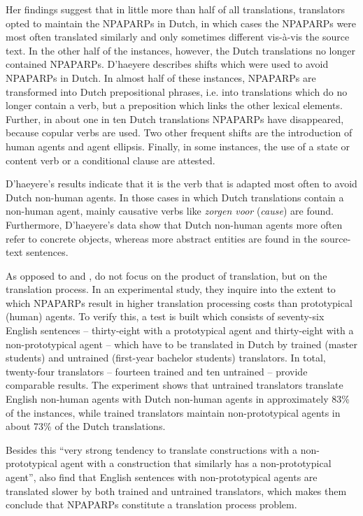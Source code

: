 \documentclass[output=paper]{LSP/langsci}
\begin{document}
Her findings suggest that in little more than half of all translations, translators opted to maintain the NPAPARPs in Dutch, in which cases the NPAPARPs were most often translated similarly and only sometimes different vis-à-vis the source text. In the other half of the instances, however, the Dutch translations no longer contained NPAPARPs. D’haeyere describes shifts which were used to avoid NPAPARPs in Dutch. In almost half of these instances, NPAPARPs are transformed into Dutch prepositional phrases, i.e. into translations which do no longer contain a verb, but a preposition which links the other lexical elements. Further, in about one in ten Dutch translations NPAPARPs have disappeared, because copular verbs are used. Two other frequent shifts are the introduction of human agents and agent ellipsis. Finally, in some instances, the use of a state or content verb or a conditional clause are attested. 

D’haeyere’s results indicate that it is the verb that is adapted most often to avoid Dutch non-human agents. In those cases in which Dutch translations contain a non-human agent, mainly causative verbs like \textit{zorgen voor} (\textit{cause}) are found. Furthermore, D’haeyere’s data show that Dutch non-human agents more often refer to concrete objects, whereas more abstract entities are found in the source-text sentences.       

As opposed to \citet{Vandepitte2007} and \citet{Dhaeyere2010}, \citet{Vandepitte2010} do not focus on the product of translation, but on the translation process. In an experimental study, they inquire into the extent to which NPAPARPs result in higher translation processing costs than prototypical (human) agents. To verify this, a test is built which consists of seventy-six English sentences – thirty-eight with a prototypical agent and thirty-eight with a non-prototypical agent – which have to be translated in Dutch by trained (master students) and untrained (first-year bachelor students) translators. In total, twenty-four translators – fourteen trained and ten untrained – provide comparable results. The experiment shows that untrained translators translate English non-human agents with Dutch non-human agents in approximately 83\% of the instances, while trained translators maintain non-prototypical agents in about 73\% of the Dutch translations. 

Besides this “very strong tendency to translate constructions with a non-prototypical agent with a construction that similarly has a non-prototypical agent”, \citet[11]{Vandepitte2011} also find that English sentences with non-prototypical agents are translated slower by both trained and untrained translators, which makes them conclude that NPAPARPs constitute a translation process problem. 
\end{document}
